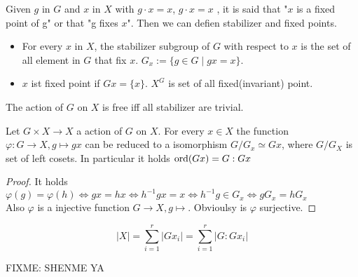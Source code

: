 Given $g$ in $G$ and $x$ in $X$ with $ g\cdot x=x$, $g\cdot x=x$ , it is said that "$x$ is a fixed point of g" or that "g fixes $x$". Then we can defien stabilizer and fixed points.
\begin{definition}
    \begin{itemize}
        \item For every $x$ in \(X\), the stabilizer subgroup of $G$ with respect to $x$ is the set of all element in $G$ that fix $x$. $G_x :=\{g\in G\mid gx = x\}$.
        \item $x$ ist fixed point if $Gx = \{x\}$. $X^G$ is set of all fixed(invariant) point.
    \end{itemize}
\end{definition}
\begin{remark}
    The action of $G$ on $X$ is free iff all stabilizer are trivial.
\end{remark}


\begin{lemma}
    Let $G\times X \to X$ a action of $G$ on $X$. For every $x\in X$ the function $\varphi : G \to X, g\mapsto gx $ can be reduced to a isomorphism $G/G_x\simeq Gx$, where $G/G_X$ is set of left cosets. In particular it holds $\operatorname{ord}(Gx) = G : Gx$
\end{lemma}
\begin{proof}
    It holds \(\varphi (g) = \varphi (h) \Leftrightarrow gx = hx \Leftrightarrow h^{-1}gx =x \Leftrightarrow h^{-1} g \in G_x \Leftrightarrow gG_x= hG_x\)\\
    Also $\varphi$ is a injective function $G \to X, g\mapsto $. Obvioulsy is $\varphi $ surjective.
\end{proof}

\begin{theorem}
    $$|X| = \sum_{i=1}^r |Gx_i| = \sum_{i=1}^r |G:Gx_i|$$
\end{theorem}

FIXME: SHENME YA